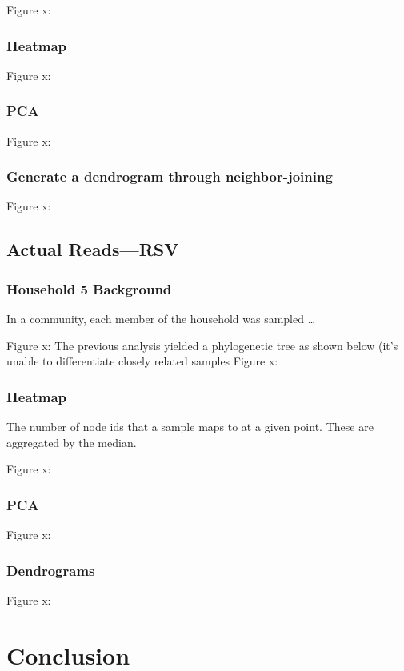 \documentclass[a4paper]{article}
\begin{document}
Figure x:
\subsubsection{Heatmap}
\label{sec:org70e4e77}

Figure x:
\subsubsection{PCA}
\label{sec:org5989601}

Figure x:
\subsubsection{Generate a dendrogram through neighbor-joining}
\label{sec:org07768c9}

Figure x:

\subsection{Actual Reads—RSV}
\label{sec:org5551cbb}
\subsubsection{Household 5 Background}
\label{sec:orgad91592}
In a community, each member of the household was sampled …

Figure x:
The previous analysis yielded a phylogenetic tree as shown below (it’s unable to differentiate closely related samples
Figure x:

\subsubsection{Heatmap}
\label{sec:org3aaeb74}
The number of node ids that a sample maps to at a given point. These are aggregated by the median.

Figure x:

\subsubsection{PCA}
\label{sec:org9ff1d05}
Figure x:

\subsubsection{Dendrograms}
\label{sec:org19122a7}
Figure x:
\section{Conclusion}
\label{sec:orgab1015a}

\newpage


\end{document}
